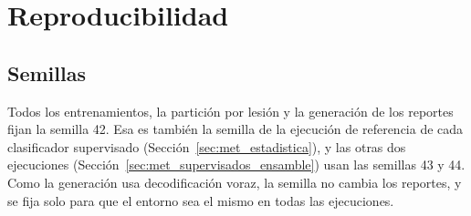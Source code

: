 \chapter{Reproducibilidad}
\label{ap:reproducibilidad}

\section{Semillas}
\label{sec:ap_semillas}

Todos los entrenamientos, la partición por lesión y la generación de los reportes fijan la semilla 42. Esa es también
la semilla de la ejecución de referencia de cada clasificador supervisado (Sección~\ref{sec:met_estadistica}), y las
otras dos ejecuciones (Sección~\ref{sec:met_supervisados_ensamble}) usan las semillas 43 y 44. Como la generación usa
decodificación voraz, la semilla no cambia los reportes, y se fija solo para que el entorno sea el mismo en todas las
ejecuciones.
